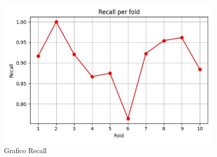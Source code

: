 \documentclass[a4paper,12pt]{report}
\begin{document}
\begin{figure}[h]
\centering
\includegraphics[width=\textwidth]{recall.png}
\caption{Grafico Recall}
\end{figure}
\end{document}
